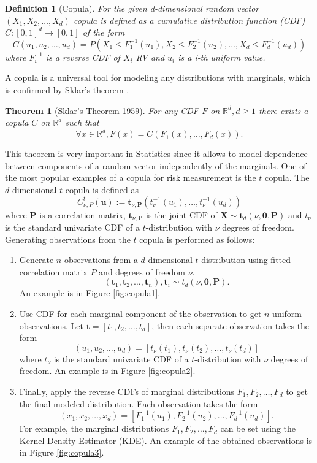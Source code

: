 \documentclass{article}
\newtheorem{definition}{Definition}[section]
\newtheorem{theorem}{Theorem}[section]
\begin{document}
\begin{definition}[Copula]
    For the given d-dimensional random vector $(X_1, X_2, \dots, X_d)$ copula is defined as a cumulative distribution function (CDF) $C: [0, 1]^d \to [0, 1]$ of the form
    $$C(u_1, u_2, \dots, u_d) = P(X_1 \leq F_1^{-1}(u_1), X_2 \leq F_2^{-1}(u_2), \dots, X_d \leq F_d^{-1}(u_d))$$
    where $F^{-1}_i$ is a reverse CDF of $X_i$ RV and $u_i$ is a i-th uniform value.
\end{definition}

A copula is a universal tool for modeling any distributions with marginals, which is confirmed by Sklar's theorem \cite{lo2018simple}.
\begin{theorem}[Sklar’s Theorem 1959]
    For any CDF $F$ on $\mathbb R^d, d \geq 1$ there exists a copula $C$ on $\mathbb R^d$ such that
    $$\forall x\in \mathbb R^d, F(x) = C(F_1(x), \dots, F_d(x)).$$
\end{theorem}

This theorem is very important in Statistics since it allows to model dependence between components of a random vector independently of the marginals. One of the most popular examples of a copula for risk measurement is the $t$ copula. The $d$-dimensional $t$-copula is defined as
$$
C_{\nu, P}^{t}(\mathbf{u}):=\mathbf{t}_{\nu, \mathbf{P}}\left(t_{\nu}^{-1}\left(u_{1}\right), \ldots, t_{\nu}^{-1}\left(u_{d}\right)\right)
$$
where $\mathbf{P}$ is a correlation matrix, $\mathbf{t}_{\nu, \mathbf{P}}$ is the joint $\mathrm{CDF}$ of $\mathbf{X} \sim \mathbf{t}_{d}(\nu, \mathbf{0}, \mathbf{P})$ and $t_{\nu}$ is the standard univariate CDF of a $t$-distribution with $\nu$ degrees of freedom. Generating observations from the $t$ copula is performed as follows:

\begin{enumerate}
    \item Generate $n$ observations from a $d$-dimensional $t$-distribution using fitted correlation matrix $P$ and degrees of freedom $\nu$.
    $$(\mathbf{t}_1, \mathbf{t}_2, \dots, \mathbf{t}_n), \mathbf{t}_i \sim t_d(\nu, \mathbf{0}, \mathbf{P} ).$$
    An example is in Figure \ref{fig:copula1}.
    \item Use CDF for each marginal component of the observation to get $n$ uniform observations. Let $\mathbf{t} = [t_{1}, t_{2}, \dots, t_{d}]$, then each separate observation takes the form
    $$(u_1, u_2, \dots, u_d) = \left[t_{\nu}(t_{1}), t_{\nu}(t_{2}), \dots, t_{\nu}(t_{d})\right]$$
    where $t_{\nu}$ is the standard univariate CDF of a $t$-distribution with $\nu$ degrees of freedom. An example is in Figure \ref{fig:copula2}.
    \item Finally, apply the reverse CDFs of marginal distributions $F_1, F_2, \dots, F_d$ to get the final modeled distribution. Each observation takes the form
    $$(x_1, x_2, \dots, x_d) = \left[ F_1^{-1}(u_1), F_2^{-1}(u_2), \dots, F_d^{-1}(u_d) \right].$$
    For example, the marginal distributions $F_1, F_2, \dots, F_d$ can be set using the Kernel Density Estimator (KDE). An example of the obtained observations is in Figure \ref{fig:copula3}.
\end{enumerate}
\end{document}
